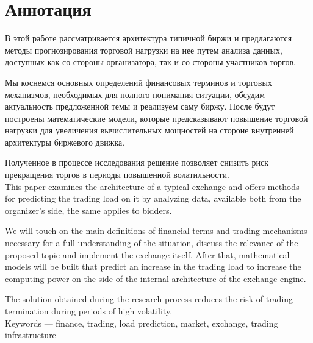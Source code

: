 \section{Аннотация}
В этой работе рассматривается архитектура типичной биржи и предлагаются методы прогнозирования торговой нагрузки на нее путем анализа данных,
доступных как со стороны организатора,
так и со стороны участников торгов.

Мы коснемся основных определений финансовых терминов и торговых механизмов, необходимых для полного понимания ситуации, обсудим актуальность предложенной темы и реализуем саму биржу. После будут  построены математические модели, которые предсказывают повышение торговой нагрузки для увеличения вычислительных мощностей на стороне внутренней архитектуры биржевого движка.

Полученное в процессе исследования решение позволяет снизить риск прекращения торгов в периоды повышенной волатильности.\\

This paper examines the architecture of a typical exchange and offers methods for predicting the trading load on it by analyzing data,
available both from the organizer's side,
the same applies to bidders.

We will touch on the main definitions of financial terms and trading mechanisms necessary for a full understanding of the situation, discuss the relevance of the proposed topic and implement the exchange itself. After that, mathematical models will be built that predict an increase in the trading load to increase the computing power on the side of the internal architecture of the exchange engine.

The solution obtained during the research process reduces the risk of trading termination during periods of high volatility.
\\

Keywords — finance, trading, load prediction, market, exchange, trading infrastructure

\pagebreak
